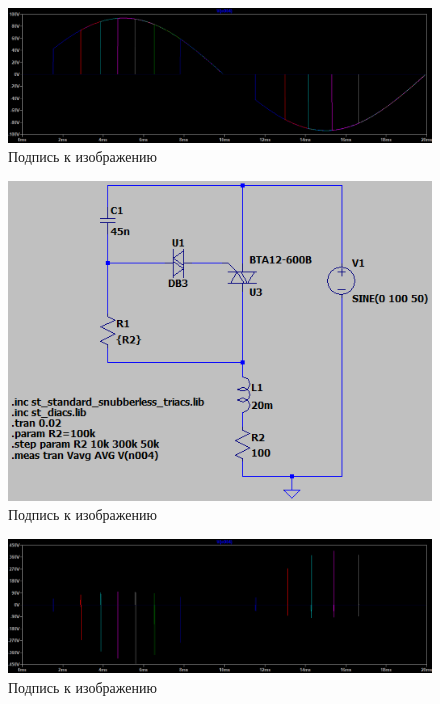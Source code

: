 \documentclass[a4paper, 12pt]{article}
\begin{document}
    \begin{figure}[H]
        \centering
        \includegraphics[scale=0.45]{R2.png}
        \captionsetup{skip=0pt}
        \caption{Подпись к изображению}
        \label{fig:R2}
    \end{figure}


    \begin{figure}[H]
        \centering
        \includegraphics[scale=0.5]{scheme5.png}
        \captionsetup{skip=0pt}
        \caption{Подпись к изображению}
        \label{fig:scheme5}
    \end{figure}


    \begin{figure}[H]
        \centering
        \includegraphics[scale=0.45]{R2_L20m.png}
        \captionsetup{skip=0pt}
        \caption{Подпись к изображению}
        \label{fig:R2_L20m}
    \end{figure}
\end{document}
